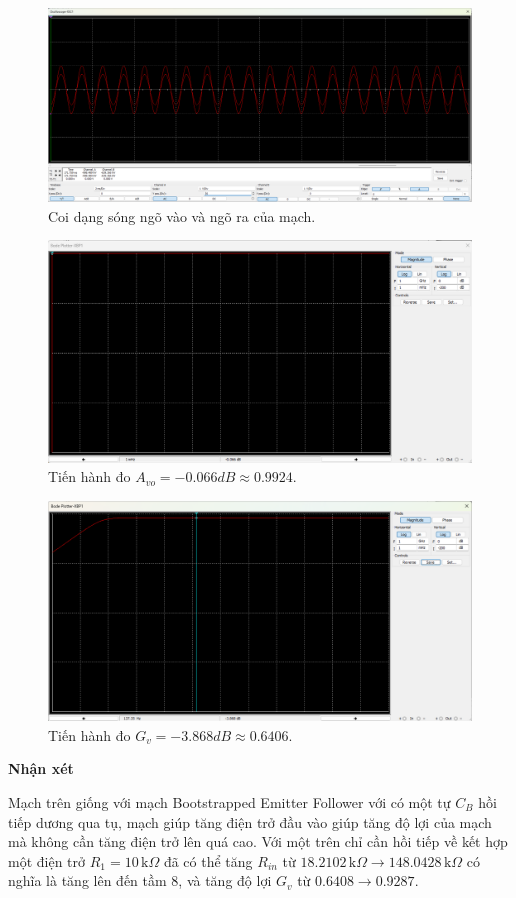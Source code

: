\begin{itemize}[label=-]
	\begin{figure}[H]
		\centering
		\includegraphics[width=.8\linewidth]{./my-chapters/my-images/Question4/cauc_wave.png}
		\caption{Coi dạng sóng ngõ vào và ngõ ra của mạch.}
	\end{figure}
	
	\begin{figure}[H]
		\centering
		\includegraphics[width=.8\linewidth]{./my-chapters/my-images/Question4/cau_c_bode_avo.png}
		\caption{Tiến hành đo $A_{vo} = -0.066dB \approx 0.9924$.}
	\end{figure}
	
	\begin{figure}[H]
		\centering
		\includegraphics[width=.8\linewidth]{./my-chapters/my-images/Question4/cau_c_bode_gv.png}
		\caption{Tiến hành đo $G_{v} = -3.868dB \approx 0.6406$.}
	\end{figure}
\end{itemize}

\noindent\textbf{Nhận xét}

Mạch trên giống với mạch Bootstrapped Emitter Follower với có một tự $C_{B}$ hồi tiếp dương qua tụ, mạch giúp tăng điện trở đầu vào giúp tăng độ lợi của mạch mà không cần tăng điện trở lên quá cao. Với một trên chỉ cần hồi tiếp về kết hợp một điện trở $R_{1} = 10 \,\text{k}\Omega$ đã có thể tăng $R_{in}$ từ $18.2102\,\text{k}\Omega \rightarrow 148.0428 \,\text{k}\Omega$ có nghĩa là tăng lên đến tầm $8$, và tăng độ lợi $G_{v}$ từ $0.6408 \rightarrow 0.9287$.